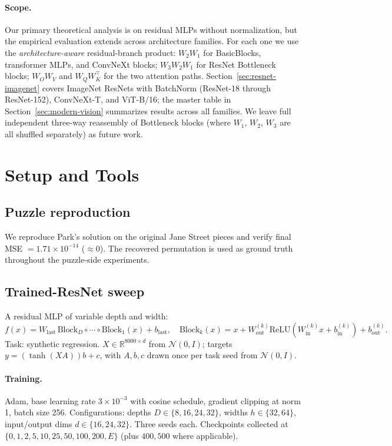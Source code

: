 \documentclass[10pt]{article}
\theoremstyle{remark}
\begin{document}
\paragraph{Scope.} Our primary theoretical analysis is on residual MLPs
without normalization, but the empirical evaluation extends across
architecture families. For each one we use the
\emph{architecture-aware} residual-branch product: $W_2 W_1$ for
BasicBlocks, transformer MLPs, and ConvNeXt blocks; $W_3 W_2 W_1$ for
ResNet Bottleneck blocks; $W_O W_V$ and $W_Q W_K^\top$ for the two
attention paths. Section~\ref{sec:resnet-imagenet} covers ImageNet
ResNets with BatchNorm (ResNet-18 through ResNet-152), ConvNeXt-T,
and ViT-B/16; the master table in
Section~\ref{sec:modern-vision} summarizes results across all
families. We leave full independent three-way reassembly of Bottleneck
blocks (where $W_1$, $W_2$, $W_3$ are all shuffled separately) as
future work.

\section{Setup and Tools}

\subsection{Puzzle reproduction}

We reproduce Park's solution on the original Jane Street pieces and
verify final MSE $=1.71\times 10^{-14}$ ($\approx 0$). The recovered
permutation is used as ground truth throughout the puzzle-side
experiments.

\subsection{Trained-ResNet sweep}

A residual MLP of variable depth and width:
\[
  f(x) = W_{\mathrm{last}}\, \mathrm{Block}_D \circ \cdots \circ \mathrm{Block}_1(x) + b_{\mathrm{last}},
  \quad
  \mathrm{Block}_k(x) = x + W_{\mathrm{out}}^{(k)} \mathrm{ReLU}(W_{\mathrm{in}}^{(k)} x + b_{\mathrm{in}}^{(k)}) + b_{\mathrm{out}}^{(k)}.
\]
Task: synthetic regression. $X \in \mathbb{R}^{8000 \times d}$ from
$\mathcal{N}(0,I)$; targets $y = (\tanh(XA))b + c$, with $A,b,c$ drawn
once per task seed from $\mathcal{N}(0,I)$.

\paragraph{Training.} Adam, base learning rate $3{\times}10^{-3}$ with
cosine schedule, gradient clipping at norm 1, batch size 256.
Configurations: depths $D\in\{8, 16, 24, 32\}$, widths $h\in\{32, 64\}$,
input/output dims $d\in\{16, 24, 32\}$. Three seeds each. Checkpoints
collected at $\{0, 1, 2, 5, 10, 25, 50, 100, 200, E\}$ (plus $400, 500$
where applicable).
\end{document}

